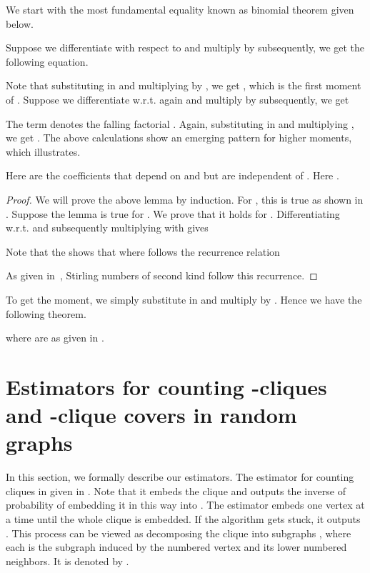 \documentclass[runningheads,a4paper]{llncs}
\begin{document}
We start with the most fundamental equality known as binomial theorem given below.
 

Suppose we differentiate  with respect to  and multiply by  subsequently, we get the following equation.


Note that substituting  in  and multiplying by , we get , which is the first moment of . Suppose we differentiate  w.r.t. 
 again and multiply by  subsequently, we get


The term  denotes the falling factorial . Again, substituting  in  and multiplying , 
we get . 
The above calculations show an emerging pattern for higher moments, which  illustrates. 
\begin{lemma}
\label{lem:app-binom}

Here  are the coefficients that depend on  and  but are independent of . Here  .
\end{lemma}
\begin{proof}
We will prove the above lemma by induction. For , this is true as shown in . Suppose the lemma is true for . We prove that it holds for . Differentiating  w.r.t.  and subsequently multiplying with  gives


Note that the  shows that  where  follows the recurrence relation 
 
As given in~\cite{K08a}, Stirling numbers of second kind follow this recurrence. 

\end{proof}
To get the  moment, we simply substitute  in  and multiply by . Hence we have the following theorem.

\begin{theorem}
\label{thm:app-binomk}

where  are as given in .
\end{theorem}

\section{Estimators for counting -cliques and -clique covers in random graphs}\label{sec:app-estimators}
In this section, we formally describe our estimators. The estimator for counting cliques in given in . Note that it embeds the clique  and outputs the inverse of probability of embedding it in this way into .
The estimator embeds one vertex at a time until the whole clique is embedded. If the algorithm gets stuck, it outputs . This process can be viewed as decomposing the clique into subgraphs , where each  is
 the subgraph induced by the  numbered vertex  and its lower numbered neighbors. It is denoted by . 
\end{document}
